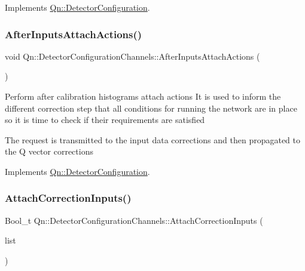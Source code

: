 Implements \mbox{\hyperlink{classQn_1_1DetectorConfiguration_ab406e0d2a85e7f5a7c74d0bd0252375d}{Qn\+::\+Detector\+Configuration}}.

\mbox{\label{classQn_1_1DetectorConfigurationChannels_aee41ab7c778ea075aa7e4f414c8817e0}} 
\subsubsection{\texorpdfstring{After\+Inputs\+Attach\+Actions()}{AfterInputsAttachActions()}}
{\footnotesize\ttfamily void Qn\+::\+Detector\+Configuration\+Channels\+::\+After\+Inputs\+Attach\+Actions (\begin{DoxyParamCaption}{ }\end{DoxyParamCaption})\hspace{0.3cm}{\ttfamily [virtual]}}

Perform after calibration histograms attach actions It is used to inform the different correction step that all conditions for running the network are in place so it is time to check if their requirements are satisfied

The request is transmitted to the input data corrections and then propagated to the Q vector corrections 

Implements \mbox{\hyperlink{classQn_1_1DetectorConfiguration_ab6766905dffe5811aefa59dd1e1117d8}{Qn\+::\+Detector\+Configuration}}.

\mbox{\label{classQn_1_1DetectorConfigurationChannels_ac02f3bf7815650e06a3b85f3c0bcd0e0}} 
\subsubsection{\texorpdfstring{Attach\+Correction\+Inputs()}{AttachCorrectionInputs()}}
{\footnotesize\ttfamily Bool\+\_\+t Qn\+::\+Detector\+Configuration\+Channels\+::\+Attach\+Correction\+Inputs (\begin{DoxyParamCaption}\item[{T\+List $\ast$}]{list }\end{DoxyParamCaption})\hspace{0.3cm}{\ttfamily [virtual]}}


